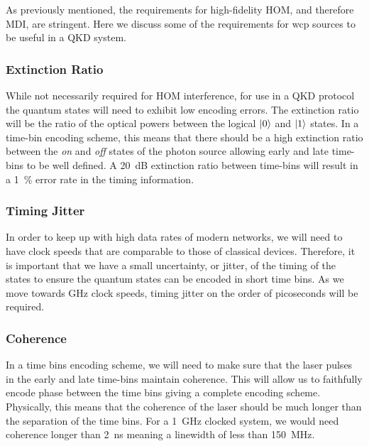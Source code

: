 As previously mentioned, the requirements for high-fidelity \ac{HOM}, and therefore \ac{MDI}, are stringent. Here we discuss some of the requirements for \ac{wcp} sources to be useful in a \ac{QKD} system. 

\subsubsection*{Extinction Ratio}

While not necessarily required for \ac{HOM} interference, for use in a \ac{QKD} protocol the quantum states will need to exhibit low encoding errors. The extinction ratio will be the ratio of the optical powers between the logical $\ket{0}$ and $\ket{1}$ states. In a time-bin encoding scheme, this means that there should be a high extinction ratio between the \textit{on} and \textit{off} states of the photon source allowing early and late time-bins to be well defined. A \SI{20}{dB} extinction ratio between time-bins will result in a \SI{1}{\percent} error rate in the timing information.


\subsubsection*{Timing Jitter}

In order to keep up with high data rates of modern networks, we will need to have clock speeds that are comparable to those of classical devices. Therefore, it is important that we have a small uncertainty, or jitter, of the timing of the states to ensure the quantum states can be encoded in short time bins. As we move towards GHz clock speeds, timing jitter on the order of picoseconds will be required.

\subsubsection*{Coherence}

In a time bins encoding scheme, we will need to make sure that the laser pulses in the early and late time-bins maintain coherence. This will allow us to faithfully encode phase between the time bins giving a complete encoding scheme. Physically, this means that the coherence of the laser should be much longer than the separation of the time bins. For a \SI{1}{GHz} clocked system, we would need coherence longer than \SI{2}{\ns} meaning a linewidth of less than \SI{150}{MHz}.

